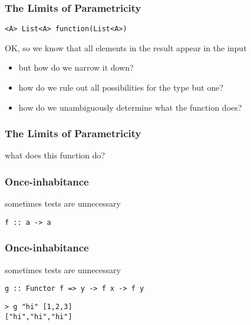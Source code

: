 \begin{frame}[fragile]
\frametitle{The Limits of Parametricity}
\begin{lstlisting}
<A> List<A> function(List<A>)
\end{lstlisting}
OK, so we know that all elements in the result appear in the input
\begin{itemize}
 \item but how do we narrow it down?
 \item how do we rule out all possibilities for the type but one?
 \item how do we unambiguously determine what the function does?
\end{itemize}
\end{frame}

\begin{frame}[fragile]
\frametitle{The Limits of Parametricity}
\begin{block}{what does this function do?}

\end{block}
\end{frame}

\begin{frame}[fragile]
\frametitle{Once-inhabitance}
\begin{block}{sometimes tests are unnecessary}
\begin{lstlisting}[style=haskell]
f :: a -> a
\end{lstlisting}
\end{block}
\end{frame}

\begin{frame}[fragile]
\frametitle{Once-inhabitance}
\begin{block}{sometimes tests are unnecessary}
\begin{lstlisting}[style=haskell]
g :: Functor f => y -> f x -> f y
\end{lstlisting}
\end{block}
\begin{lstlisting}[style=haskell]
> g "hi" [1,2,3]
["hi","hi","hi"]
\end{lstlisting}
\end{frame}

